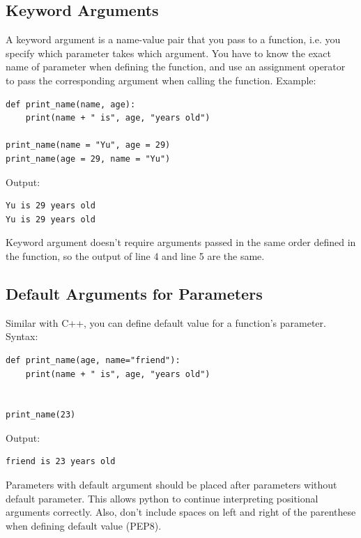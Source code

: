 \documentclass[12pt]{book}
\begin{document}
\subsection{Keyword Arguments}
\label{sec:org7d67d5f}
A keyword argument is a name-value pair that you pass to a function, i.e. you specify which parameter takes which argument. You have to know the exact name of parameter when defining the function, and use an assignment operator to pass the corresponding argument when calling the function. Example:
\begin{verbatim}
def print_name(name, age):
    print(name + " is", age, "years old")

print_name(name = "Yu", age = 29)
print_name(age = 29, name = "Yu")
\end{verbatim}
Output:
\begin{verbatim}
Yu is 29 years old
Yu is 29 years old
\end{verbatim}
Keyword argument doesn't require arguments passed in the same order defined in the function, so the output of line 4 and line 5 are the same.

\subsection{Default Arguments for Parameters}
\label{sec:org20cfc62}
Similar with C++, you can define default value for a function's parameter. Syntax:
\begin{verbatim}
def print_name(age, name="friend"):
    print(name + " is", age, "years old")


print_name(23)
\end{verbatim}
Output:
\begin{verbatim}
friend is 23 years old
\end{verbatim}
Parameters with default argument should be placed after parameters without default parameter. This allows python to continue interpreting positional arguments correctly. Also, don't include spaces on left and right of the parenthese when defining default value (PEP8).
\end{document}
